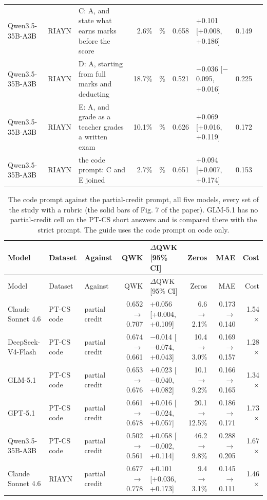 \documentclass[10pt]{article}
\begin{document}
\begin{longtable}{ll>{\raggedright\arraybackslash}p{2.9cm}r>{\raggedright\arraybackslash}p{1.4cm}r>{\raggedright\arraybackslash}p{2.6cm}r>{\raggedright\arraybackslash}p{1.05cm}}
Qwen3.5-35B-A3B & RIAYN & C: A, and state what earns marks before the score & 2.6\% & 0.3\% & 0.658 & +0.101 [+0.008, +0.186] & 0.149 & 74 \\
Qwen3.5-35B-A3B & RIAYN & D: A, starting from full marks and deducting & 18.7\% & 13.3\% & 0.521 & $-$0.036 [$-$0.095, +0.016] & 0.225 & 8 \\
Qwen3.5-35B-A3B & RIAYN & E: A, and grade as a teacher grades a written exam & 10.1\% & 5.1\% & 0.626 & +0.069 [+0.016, +0.119] & 0.172 & 9 \\
Qwen3.5-35B-A3B & RIAYN & the code prompt: C and E joined & 2.7\% & 0.0\% & 0.651 & +0.094 [+0.007, +0.174] & 0.153 & 74 \\
\hline
\end{longtable}
\endgroup

\begingroup\footnotesize
\begin{longtable}{ll>{\raggedright\arraybackslash}p{1.6cm}r>{\raggedright\arraybackslash}p{2.6cm}rrr}
\caption{The code prompt against the partial-credit prompt, all five models, every set of the study with a rubric (the solid bars of Fig. 7 of the paper). GLM-5.1 has no partial-credit cell on the PT-CS short answers and is compared there with the strict prompt. The guide uses the code prompt on code only.}\\
\hline
Model & Dataset & Against & QWK & $\Delta$QWK [95\% CI] & Zeros & MAE & Cost \\ \hline
\endfirsthead
\hline
Model & Dataset & Against & QWK & $\Delta$QWK [95\% CI] & Zeros & MAE & Cost \\ \hline
\endhead
Claude Sonnet 4.6 & PT-CS code & partial credit & 0.652 $\to$ 0.707 & +0.056 [+0.004, +0.109] & 6.6 $\to$ 2.1\% & 0.173 $\to$ 0.140 & 1.54$\times$ \\
DeepSeek-V4-Flash & PT-CS code & partial credit & 0.674 $\to$ 0.661 & $-$0.014 [$-$0.074, +0.043] & 10.4 $\to$ 3.0\% & 0.169 $\to$ 0.157 & 1.28$\times$ \\
GLM-5.1 & PT-CS code & partial credit & 0.653 $\to$ 0.676 & +0.023 [$-$0.040, +0.082] & 10.1 $\to$ 9.2\% & 0.166 $\to$ 0.165 & 1.34$\times$ \\
GPT-5.1 & PT-CS code & partial credit & 0.661 $\to$ 0.678 & +0.016 [$-$0.024, +0.057] & 20.1 $\to$ 12.5\% & 0.186 $\to$ 0.171 & 1.73$\times$ \\
Qwen3.5-35B-A3B & PT-CS code & partial credit & 0.502 $\to$ 0.561 & +0.058 [$-$0.002, +0.114] & 46.2 $\to$ 9.8\% & 0.288 $\to$ 0.205 & 1.67$\times$ \\
Claude Sonnet 4.6 & RIAYN & partial credit & 0.677 $\to$ 0.778 & +0.101 [+0.036, +0.173] & 9.4 $\to$ 3.1\% & 0.145 $\to$ 0.111 & 1.46$\times$ \\

\end{longtable}
\end{document}
